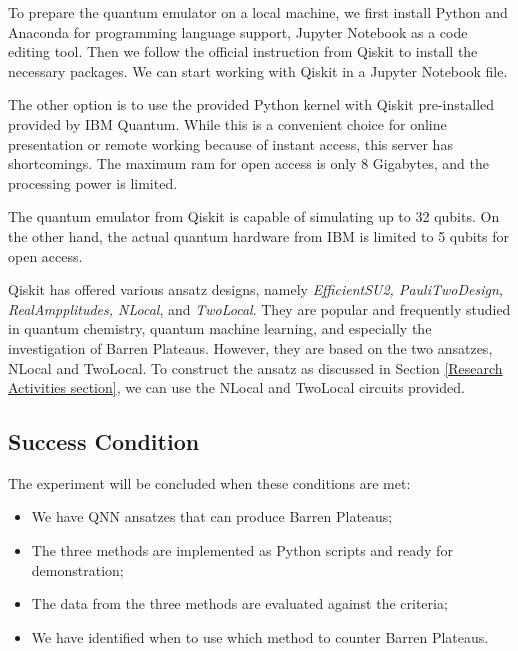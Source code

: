 To prepare the quantum emulator on a local machine, we first install Python and Anaconda for programming language support, Jupyter Notebook as a code editing tool.
Then we follow the official instruction from Qiskit \cite{Qiskit} to install the necessary packages.
We can start working with Qiskit in a Jupyter Notebook file.

The other option is to use the provided Python kernel with Qiskit pre-installed provided by IBM Quantum. 
While this is a convenient choice for online presentation or remote working because of instant access, this server has shortcomings. The maximum ram for open access is only 8 Gigabytes, and the processing power is limited.

The quantum emulator from Qiskit is capable of simulating up to 32 qubits. On the other hand, the actual quantum hardware from IBM is limited to 5 qubits for open access.

Qiskit has offered various ansatz designs, namely \textit{EfficientSU2, PauliTwoDesign, RealAmpplitudes, NLocal}, and \textit{TwoLocal}. They are popular and frequently studied in quantum chemistry, quantum machine learning, and especially the investigation of Barren Plateaus. 
However, they are based on the two ansatzes, NLocal and TwoLocal.
To construct the ansatz as discussed in Section \ref{Research Activities section}, we can use the NLocal and TwoLocal circuits provided.


\subsection{Success Condition}
The experiment will be concluded when these conditions are met:
\begin{itemize}
    \item We have QNN ansatzes that can produce Barren Plateaus;
    \item The three methods are implemented as Python scripts and ready for demonstration;
    \item The data from the three methods are evaluated against the criteria;
    \item We have identified when to use which method to counter Barren Plateaus.
\end{itemize}